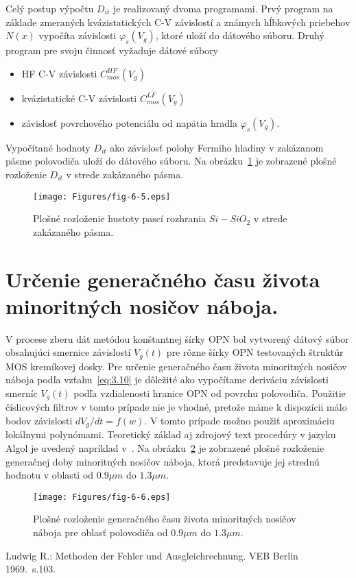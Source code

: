 Celý postup výpočtu $D_{it}$ je realizovaný dvoma programami. Prvý
program na základe zmeraných kvázistatických C-V závislostí a známych
hĺbkových priebehov $N(x)$ vypočíta závislosti $\varphi_{s}(V_{g})$,
ktoré uloží do dátového súboru. Druhý program pre svoju činnosť
vyžaduje dátové súbory

\begin{itemize}
\item HF C-V závislosti $C_{mos}^{HF}(V_{g})$
\item kvázistatické C-V závislosti $C_{mos}^{LF}(V_{g})$
\item závislosť povrchového potenciálu od napätia hradla $\varphi_{s}(V_{g})$.
\end{itemize}

Vypočítané hodnoty $D_{it}$ ako závislosť polohy Fermiho hladiny v
zakázanom pásme polovodiča uloží do dátového súboru. Na
obrázku~\ref{fig:6.5} je zobrazené plošné rozloženie $D_{it}$ v strede
zakázaného pásma.

\begin{figure}[h!]\centering
  \texttt{[image: Figures/fig-6-5.eps]}
  \caption[Plošné rozloženie hustoty pascí rozhrania $Si-SiO_{2}$ v
    strede zakázaného pásma]{Plošné rozloženie hustoty pascí rozhrania
    $Si-SiO_{2}$ v strede zakázaného pásma.}\label{fig:6.5}
\end{figure}

\section{Určenie generačného času života minoritných nosičov náboja.}\label{sec:6.4}

V procese zberu dát metódou konštantnej šírky OPN bol vytvorený dátový
súbor obsahujúci smernice závislostí $V_{g}(t)$ pre rôzne šírky OPN
testovaných štruktúr MOS kremíkovej dosky. Pre určenie generačného
času života minoritných nosičov náboja podľa vzťahu~\ref{eq:3.10} je
dôležité ako vypočítame deriváciu závislosti smerníc $V_{g}(t)$ podľa
vzdialenosti hranice OPN od povrchu polovodiča. Použitie číslicových
filtrov v tomto prípade nie je vhodné, pretože máme k dispozícii málo
bodov závislosti $dV_{g}/dt = f(w)$. V tomto prípade možno použiť
aproximáciu lokálnymi polynómami. Teoretický základ aj zdrojový text
procedúry v jazyku Algol je uvedený napríklad v~\cite{6.1}. Na
obrázku~\ref{fig:6.6} je zobrazené plošné rozloženie generačnej doby
minoritných nosičov náboja, ktorá predstavuje jej strednú hodnotu v
oblasti od $0.9\mu m$ do $1.3\mu m$.

\begin{figure}[h!]\centering
  \texttt{[image: Figures/fig-6-6.eps]}
  \caption[Plošné rozloženie generačného času života minoritných
    nosičov náboja]{Plošné rozloženie generačného času života
    minoritných nosičov náboja pre oblasť polovodiča od $0.9 \mu m$ do
    $1.3 \mu m$.}\label{fig:6.6}
\end{figure}

\begin{thebibliography}{}
  Ludwig R.: Methoden der Fehler und Ausgleichrechnung. VEB Berlin 1969.\ s.103.
\end{thebibliography}
